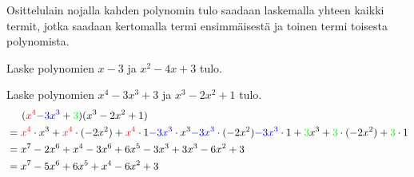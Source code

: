 Osittelulain nojalla kahden polynomin tulo saadaan laskemalla yhteen kaikki
termit, jotka saadaan kertomalla termi ensimmäisestä ja toinen termi toisesta
polynomista.



\begin{esimerkki}
Laske polynomien $x-3$ ja $x^2-4x+3$ tulo. \\
\newline
\end{esimerkki}

\begin{esimerkki}
Laske polynomien $x^4-3x^3+3$ ja $x^3-2x^2+1$ tulo. \\
\begin{align*}
&\hspace{0.5cm}(\textcolor{red}{x^4} \textcolor{blue}{-3x^3} +{}\textcolor{green}{3})(x^3-2x^2+1) \\
&= \textcolor{red}{x^4}\cdot x^3 + \textcolor{red}{x^4}\cdot (-2x^2)+\textcolor{red}{x^4}\cdot 1\textcolor{blue}{-3x^3}\cdot x^3\textcolor{blue}{-3x^3}\cdot(-2x^2)\textcolor{blue}{-3x^3}\cdot1+\textcolor{green}{3}x^3+\textcolor{green}{3}\cdot(-2x^2)+\textcolor{green}{3}\cdot 1 \\
&= x^7-2x^6+x^4-3x^6+6x^5-3x^3+3x^3-6x^2+3 \\
&= x^7-5x^6+6x^5+x^4-6x^2+3
\end{align*}
\end{esimerkki}

